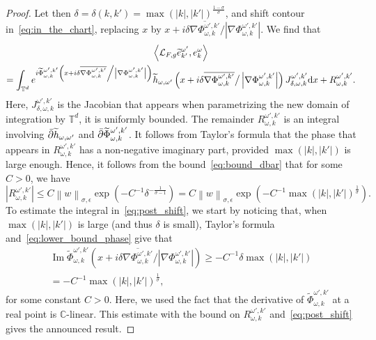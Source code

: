 \documentclass[10pt]{amsart}
\theoremstyle{definition}\newtheorem{defi}[theo]{Definition}\newtheorem{rema}[theo]{Remark}\newtheorem{exam}[theo]{Example}\newtheorem{exem}[theo]{Example}\newtheorem{nota}[theo]{Notation}
\DeclareMathOperator{\im}{Im}
\newcommand{\p}[1]{\left(#1\right)}
\newcommand{\n}[1]{\left\|#1\right\|}
\newcommand{\va}[1]{\left|#1\right|}
\newcommand{\clL}{\mathcal{L}}
\newcommand{\bbC}{\mathbb{C}}
\newcommand{\bbT}{\mathbb{T}}
\newcommand{\rmd}{\mathrm{d}}
\let\oldtilde\tilde
\renewcommand*{\tilde}[1]{\mathchoice{\widetilde{#1}}{\widetilde{#1}}{\oldtilde{#1}}{\oldtilde{#1}}}
\begin{document}
\begin{proof}
Let then $\delta = \delta(k,k') = \max(|k|,|k'|)^{\frac{1 - \sigma}{\sigma}}$, and shift contour in~\eqref{eq:in_the_chart}, replacing $x$ by $x + i \delta \overline{\nabla \Phi_{\omega,k}^{\omega',k'}}/ \va{\nabla \Phi_{\omega,k}^{\omega',k'}}$. We find that
\begin{multline}\label{eq:post_shift}
\left\langle \clL_{F,g} \tilde{e}_{k'}^{\omega'}, e_k^\omega \right\rangle \\ = \int_{\bbT^d} e^{i \widetilde{\Phi}_{\omega,k}^{\omega',k'} \left(x+ i\delta \overline{\nabla \Phi_{\omega,k}^{\omega',k'}} \middle/ \va{\nabla \Phi_{\omega,k}^{\omega',k'}}\right)} \tilde{h}_{\omega,\omega'}\left(x + i\delta \overline{\nabla \Phi_{\omega,k}^{\omega',k'}} \big/ \va{\nabla \Phi_{\omega,k}^{\omega',k'}}\right) J_{\delta,\omega,k}^{\omega',k'} \rmd x + R_{\omega,k}^{\omega',k'}.
\end{multline}
Here, $J_{\delta,\omega,k}^{\omega',k'}$ is the Jacobian that appears when parametrizing the new domain of integration by $\bbT^d$, it is uniformly bounded. The remainder $R_{\omega,k}^{\omega',k'}$ is an integral involving $\bar{\partial} \tilde{h}_{\omega,\omega'}$ and $\bar{\partial} \tilde{\Phi}_{\omega,k}^{\omega',k'}$. It follows from Taylor's formula that the phase that appears in $R_{\omega,k}^{\omega',k'}$ has a non-negative imaginary part, provided $\max(|k|,|k'|)$ is large enough. Hence, it follows from the bound~\eqref{eq:bound_dbar} that for some $C > 0$, we have
\begin{equation*}
\va{R_{\omega,k}^{\omega',k'}} \leq C \n{w}_ {\sigma,\epsilon} \exp\p{ - C^{-1} \delta^{- \frac{1}{\sigma - 1}}} = C \n{w}_{\sigma,\epsilon} \exp\p{ - C^{-1} \max(|k|,|k'|)^{\frac{1}{\sigma}}}.
\end{equation*}
To estimate the integral in~\eqref{eq:post_shift}, we start by noticing that, when $\max(|k|,|k'|)$ is large (and thus $\delta$ is small), Taylor's formula and~\eqref{eq:lower_bound_phase} give that
\begin{multline*}
\im \widetilde{\Phi}_{\omega,k}^{\omega',k'} \left(x+ i\delta \overline{\nabla \Phi_{\omega,k}^{\omega',k'}} \big/ \va{\nabla \Phi_{\omega,k}^{\omega',k'}}\right) \geq - C^{-1} \delta \max(|k|,|k'|) \\ = -C^{-1} \max(|k|,|k'|)^{\frac{1}{\sigma}},
\end{multline*}
for some constant $C > 0$. Here, we used the fact that the derivative of $\widetilde{\Phi}_{\omega,k}^{\omega',k'}$ at a real point is $\bbC$-linear. This estimate with the bound on $R_{\omega,k}^{\omega',k'}$ and~\eqref{eq:post_shift} gives the announced result.
\end{proof}
\end{document}
